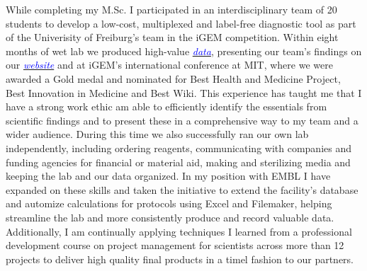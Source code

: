 \documentclass[11pt,a4paper,sans]{moderncv}
\begin{document}
\begin{spacing}{1.15}
While completing my M.Sc. I participated in an interdisciplinary team of 20 students to develop a low-cost, multiplexed and label-free diagnostic tool as part of the Univerisity of Freiburg's team in the iGEM competition.
Within eight months of wet lab we produced high-value {\href{https://www.ncbi.nlm.nih.gov/pubmed/29803867}{\textcolor{blue}{\textit{data}}}}, presenting our team's findings on our {\href{http://2015.igem.org/Team:Freiburg}{\textcolor{blue}{\textit{website}}}} and at iGEM's international conference at MIT, where we were awarded a Gold medal and nominated for Best Health and Medicine Project, Best Innovation in Medicine and Best Wiki.
This experience has taught me that I have a strong work ethic am able to efficiently identify the essentials from scientific findings and to present these in a comprehensive way to my team and a wider audience.
During this time we also successfully ran our own lab independently, including ordering reagents, communicating with companies and funding agencies for financial or material aid, making and sterilizing media and keeping the lab and our data organized. 
In my position with EMBL I have expanded on these skills and taken the initiative to extend the facility's database and automize calculations for protocols using Excel and Filemaker, helping streamline the lab and more consistently produce and record valuable data.
Additionally, I am continually applying techniques I learned from a professional development course on project management for scientists across more than 12 projects to deliver high quality final products in a timel fashion to our partners.
\par


\end{spacing}
\end{document}
